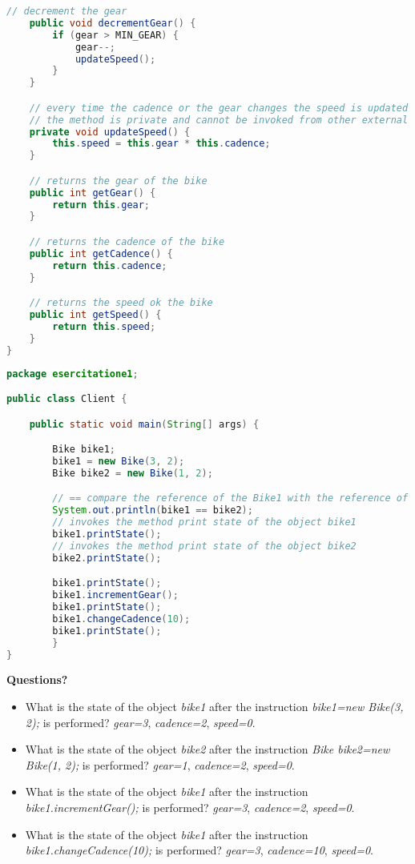 \documentclass{article}
\theoremstyle{definition}
\begin{document}
\begin{lstlisting}[language=Java,escapechar=|]
	// decrement the gear
	public void decrementGear() {
		if (gear > MIN_GEAR) {
			gear--;
			updateSpeed();
		}
	}

	// every time the cadence or the gear changes the speed is updated
	// the method is private and cannot be invoked from other external classes
	private void updateSpeed() {
		this.speed = this.gear * this.cadence;
	}

	// returns the gear of the bike
	public int getGear() {
		return this.gear;
	}

	// returns the cadence of the bike
	public int getCadence() {
		return this.cadence;
	}

	// returns the speed ok the bike
	public int getSpeed() {
		return this.speed;
	}
}
\end{lstlisting}

\begin{lstlisting}[language=Java,escapechar=|]
package esercitatione1;

public class Client {

	public static void main(String[] args) {

		Bike bike1;
		bike1 = new Bike(3, 2);
		Bike bike2 = new Bike(1, 2);

		// == compare the reference of the Bike1 with the reference of the Bike2
		System.out.println(bike1 == bike2);
		// invokes the method print state of the object bike1
		bike1.printState();
		// invokes the method print state of the object bike2
		bike2.printState();

		bike1.printState();
		bike1.incrementGear();
		bike1.printState();
		bike1.changeCadence(10);
		bike1.printState();
	    }
}
\end{lstlisting}
\textbf{Questions?}\\
\begin{itemize}
\item What is  the state of the object \emph{bike1} after the instruction  \emph{bike1=new Bike(3, 2);} is performed? 
\emph{gear=3}, \emph{cadence=2}, \emph{speed=0}.
\item What is  the state of the object \emph{bike2} after the instruction  \emph{Bike bike2=new Bike(1, 2);} is performed? 
\emph{gear=1}, \emph{cadence=2}, \emph{speed=0}.
\item What is  the state of the object \emph{bike1} after the instruction  \emph{bike1.incrementGear();} is performed? 
\emph{gear=3}, \emph{cadence=2}, \emph{speed=0}.
\item What is  the state of the object \emph{bike1} after the instruction  \emph{bike1.changeCadence(10);} is performed? 
\emph{gear=3}, \emph{cadence=10}, \emph{speed=0}.
\end{itemize}
\end{document}
